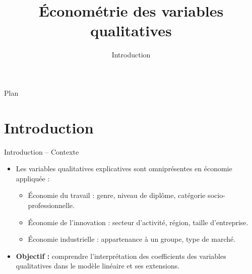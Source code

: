 \documentclass[11pt,aspectratio=169]{beamer}
\title{Économétrie des variables qualitatives}
\subtitle{Introduction}
\author{}
\date{}
\institute{}
\begin{document}
\begin{frame}
\titlepage
\end{frame}

\begin{frame}{Plan}
\tableofcontents
\end{frame}

\section{Introduction}

\begin{frame}{Introduction -- Contexte}

\begin{itemize}

\item Les variables qualitatives explicatives sont omniprésentes en économie appliquée :
  \begin{itemize}
  \item Économie du travail : genre, niveau de diplôme, catégorie socio-professionnelle.
  \item Économie de l'innovation : secteur d'activité, région, taille d'entreprise.
  \item Économie industrielle : appartenance à un groupe, type de marché.
  \end{itemize}

\item \textbf{Objectif :} comprendre l'interprétation des coefficients des variables qualitatives dans le modèle linéaire et ses extensions.

\end{itemize}

\end{frame}
\end{document}
